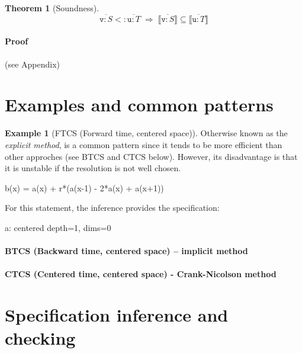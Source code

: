 \documentclass[9pt]{sigplanconf}
\newcounter{block}
\theoremstyle{definition}
\newtheorem{theorem}[block]{Theorem}
\newtheorem{example}[block]{Example}
\newcommand{\interp}[1]{\llbracket{#1}\rrbracket}
\begin{document}
\begin{theorem}[Soundness]
\[
\overline{\texttt{v} : S} <: \overline{\texttt{u} : T}
\; \Rightarrow \;
\interp{\overline{\texttt{v} : S}} \subseteq \interp{\overline{\texttt{u} : T}}
\]
\end{theorem}

\paragraph{Proof} (see Appendix)



\section{Examples and common patterns}

\begin{example}[FTCS (Forward time, centered space)]

  Otherwise known as the \emph{explicit method}, is a common
  pattern since it tends to be more efficient than other approches
  (see BTCS and CTCS below). However, its disadvantage is that it is
  unstable if the resolution is not well chosen. 

\begin{ExmVerbatim}
b(x) = a(x) + r*(a(x-1) - 2*a(x) + a(x+1))
\end{ExmVerbatim}
%
For this statement, the inference provides the specification: 
%
\begin{SpecVerbatim}
a: centered depth=1, dims=0
\end{SpecVerbatim}



\end{example}

\paragraph{BTCS (Backward time, centered space) -- implicit method}

\paragraph{CTCS (Centered time, centered space) - Crank-Nicolson method}

\section{Specification inference and checking}
\label{sec:analysis}
\end{document}

